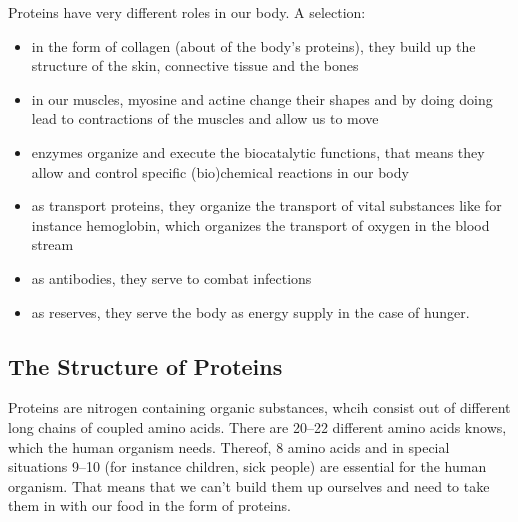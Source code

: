 \documentclass[../main.tex]{subfiles}
\begin{document}
Proteins have very different roles in our body. A selection:
\begin{itemize}
\item in the form of collagen (about  of the body's proteins), they build up the structure of the skin, connective tissue and the bones
\item in our muscles, myosine and actine change their shapes and by doing doing lead to contractions of the muscles and allow us to move
\item enzymes organize and execute the biocatalytic functions, that means they allow  and control specific (bio)chemical reactions in our body
\item as transport proteins, they organize the transport of vital substances like for instance hemoglobin, which organizes the transport of oxygen in the blood stream
\item as antibodies, they serve to combat infections
  \item as reserves, they serve the body as energy supply in the case of hunger.
  \end{itemize}

  \subsection{The Structure of Proteins}

  Proteins are nitrogen containing organic substances, whcih consist out of different long chains of coupled amino acids.
  There are 20--22 different amino acids knows, which the human organism needs.
  Thereof, 8 amino acids and in special situations 9--10 (for instance children, sick people) are essential for the human organism.
  That means that we can't build them up ourselves and need to take them in with our food in the form of proteins.
\end{document}
